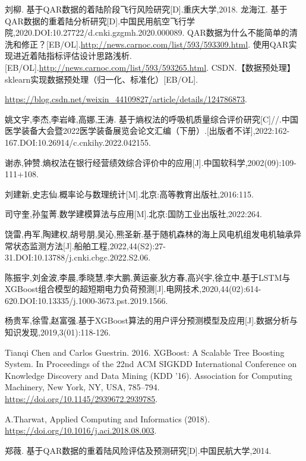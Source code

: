 \documentclass{MathorCupModeling}
\begin{document}
	\newpage
	\begin{spacing}{1.08}
	\begin{thebibliography}{99}
	刘柳. 基于QAR数据的着陆阶段飞行风险研究[D].重庆大学,2018.
	龙海江. 基于QAR数据的重着陆分析研究[D].中国民用航空飞行学院,2020.DOI:10.27722/d.cnki.gzgmh.2020.000089.
	QAR数据为什么不能简单的清洗和修正？[EB/OL].\url{http://news.carnoc.com/list/593/593309.html}.
	使用QAR实现进近着陆指标评估设计思路浅析.[EB/OL].\url{http://news.carnoc.com/list/593/593265.html}.
	CSDN.【数据预处理】sklearn实现数据预处理（归一化、标准化）[EB/OL].
	
	\url{https://blog.csdn.net/weixin_44109827/article/details/124786873}.

	姚文宇,李杰,李岩峰,高娜,王涛. 基于熵权法的呼吸机质量综合评价研究[C]//.中国医学装备大会暨2022医学装备展览会论文汇编（下册）.[出版者不详],2022:162-167.DOI:10.26914/c.cnkihy.2022.042155.

	谢赤,钟赞.熵权法在银行经营绩效综合评价中的应用[J].中国软科学,2002(09):109-111+108.

	刘建新,史志仙.概率论与数理统计[M].北京:高等教育出版社,2016:115.

	司守奎,孙玺菁.数学建模算法与应用[M].北京:国防工业出版社,2022:264.

	饶雷,冉军,陶建权,胡号朋,吴沁,熊圣新.基于随机森林的海上风电机组发电机轴承异常状态监测方法[J].船舶工程,2022,44(S2):27-31.DOI:10.13788/j.cnki.cbgc.2022.S2.06.

	陈振宇,刘金波,李晨,季晓慧,李大鹏,黄运豪,狄方春,高兴宇,徐立中.基于LSTM与XGBoost组合模型的超短期电力负荷预测[J].电网技术,2020,44(02):614-620.DOI:10.13335/j.1000-3673.pst.2019.1566.

	杨贵军,徐雪,赵富强.基于XGBoost算法的用户评分预测模型及应用[J].数据分析与知识发现,2019,3(01):118-126.

	Tianqi Chen and Carlos Guestrin. 2016. XGBoost: A Scalable Tree Boosting System. In Proceedings of the 22nd ACM SIGKDD International Conference on Knowledge Discovery and Data Mining (KDD '16). Association for Computing Machinery, New York, NY, USA, 785–794. \url{https://doi.org/10.1145/2939672.2939785}.

	A.Tharwat, Applied Computing and Informatics (2018). \url{https://doi.org/10.1016/j.aci.2018.08.003}.

	郑薇. 基于QAR数据的重着陆风险评估及预测研究[D].中国民航大学,2014.

	\end{thebibliography}
	\end{spacing}
	\newpage
\end{document}
